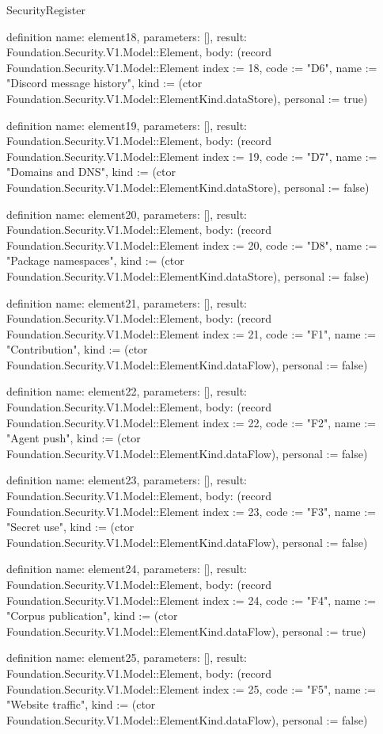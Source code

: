 \begin{lexlean}{SecurityRegister}
\begin{semanticmodule}
definition{
  name: element18,
  parameters: [],
  result: Foundation.Security.V1.Model::Element,
  body: (record Foundation.Security.V1.Model::Element {index := 18, code := "D6", name := "Discord message history", kind := (ctor Foundation.Security.V1.Model::ElementKind.dataStore), personal := true})
}

definition{
  name: element19,
  parameters: [],
  result: Foundation.Security.V1.Model::Element,
  body: (record Foundation.Security.V1.Model::Element {index := 19, code := "D7", name := "Domains and DNS", kind := (ctor Foundation.Security.V1.Model::ElementKind.dataStore), personal := false})
}

definition{
  name: element20,
  parameters: [],
  result: Foundation.Security.V1.Model::Element,
  body: (record Foundation.Security.V1.Model::Element {index := 20, code := "D8", name := "Package namespaces", kind := (ctor Foundation.Security.V1.Model::ElementKind.dataStore), personal := false})
}

definition{
  name: element21,
  parameters: [],
  result: Foundation.Security.V1.Model::Element,
  body: (record Foundation.Security.V1.Model::Element {index := 21, code := "F1", name := "Contribution", kind := (ctor Foundation.Security.V1.Model::ElementKind.dataFlow), personal := false})
}

definition{
  name: element22,
  parameters: [],
  result: Foundation.Security.V1.Model::Element,
  body: (record Foundation.Security.V1.Model::Element {index := 22, code := "F2", name := "Agent push", kind := (ctor Foundation.Security.V1.Model::ElementKind.dataFlow), personal := false})
}

definition{
  name: element23,
  parameters: [],
  result: Foundation.Security.V1.Model::Element,
  body: (record Foundation.Security.V1.Model::Element {index := 23, code := "F3", name := "Secret use", kind := (ctor Foundation.Security.V1.Model::ElementKind.dataFlow), personal := false})
}

definition{
  name: element24,
  parameters: [],
  result: Foundation.Security.V1.Model::Element,
  body: (record Foundation.Security.V1.Model::Element {index := 24, code := "F4", name := "Corpus publication", kind := (ctor Foundation.Security.V1.Model::ElementKind.dataFlow), personal := true})
}

definition{
  name: element25,
  parameters: [],
  result: Foundation.Security.V1.Model::Element,
  body: (record Foundation.Security.V1.Model::Element {index := 25, code := "F5", name := "Website traffic", kind := (ctor Foundation.Security.V1.Model::ElementKind.dataFlow), personal := false})
}


\end{semanticmodule}
\end{lexlean}
